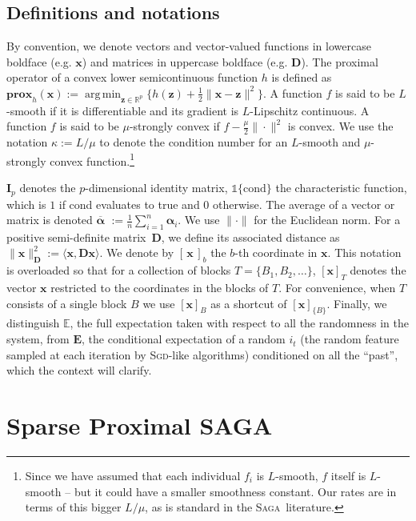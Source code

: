 \documentclass{article}
\def\RR{{\mathbb R}}
\def\EE{{\mathbb E}}
\newcommand{\Econd}{\mathbf{E}}
\def\prox{{\mathbf{prox}}}
\newcommand{\SAGA}{\textsc{Saga}}
\newcommand{\SGD}{\textsc{Sgd}}
\DeclareMathOperator*{\argmin}{arg\,min}
\def\xx{{\boldsymbol x}}
\def\zz{{\boldsymbol z}}
\def\DD{{\boldsymbol D}}
\renewcommand{\llbracket}{[}
\renewcommand{\rrbracket}{]}
\begin{document}
\subsection{Definitions and notations}
By convention, we denote vectors and vector-valued functions in lowercase boldface (e.g. $\xx$) and matrices in uppercase boldface  (e.g. $\boldsymbol D$).
%
The { proximal operator } of a convex lower semicontinuous function $h$ is defined as
$  \prox_{ h}(\xx) := \argmin_{\zz \in \RR^p} \{ h(\zz) + \frac{1}{2}\|\xx - \zz\|^2\}$.
A function $f$ is said to be {$L$-smooth} if it is differentiable and its gradient is $L$-Lipschitz continuous.
A function $f$ is said to be {$\mu$-strongly convex} if $f - \frac{\mu}{2}\|\cdot\|^2$ is convex.
We use the notation $\kappa := L/\mu$ to denote the condition number for an $L$-smooth and $\mu$-strongly convex function.\footnote{Since we have assumed that each individual $f_i$ is $L$-smooth, $f$ itself is $L$-smooth -- but it could have a smaller smoothness constant. Our rates are in terms of this bigger $L/\mu$, as is standard in the \SAGA\ literature.}

$\boldsymbol{I}_{p}$ denotes the $p$-dimensional identity matrix, $\mathds{1}\{\text{cond}\}$ the characteristic function, which is $1$ if cond evaluates to true and $0$ otherwise.
The average of a vector or matrix is denoted $\overline{\boldsymbol\alpha}$ $:= \frac{1}{n}\sum_{i=1}^n {\boldsymbol\alpha}_i$.
We use $\| \cdot \|$ for the Euclidean norm.
For a positive semi-definite matrix~$\DD$, we define its associated distance as $\|\xx\|^2_{\boldsymbol{D}} := \langle \xx, \boldsymbol{D} \xx\rangle$. We denote by $[\,\xx\,]_b$ the $b$-th coordinate in $\xx$. This notation is overloaded so that for a collection of blocks $T = \{B_1, B_2, \ldots\}$, $\llbracket \xx \rrbracket_T$ denotes the vector $\xx$ restricted to the coordinates in the blocks of $T$. For convenience, when $T$ consists of a single block $B$ we use $\llbracket \xx \rrbracket_B$  as a shortcut of $\llbracket \xx \rrbracket_{\{B\}}$.
Finally, we distinguish $\EE$, the full expectation taken with respect to all the randomness in the system, from $\Econd$, the conditional expectation of a random $i_t$ (the random feature sampled at each iteration by \SGD-like algorithms) conditioned on all the ``past'', which the context will clarify.


\section{Sparse Proximal SAGA }\label{scs:sparse_prox_saga}
\end{document}
